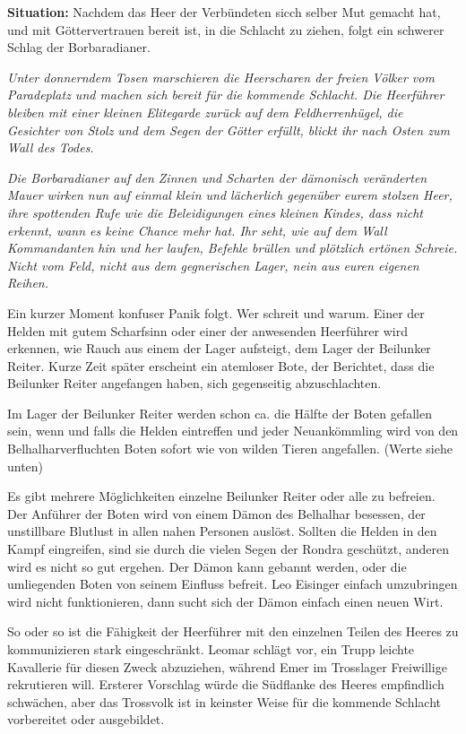 \textbf{Situation:} Nachdem das Heer der Verbündeten sicch selber Mut gemacht hat, und mit Göttervertrauen bereit ist, in die Schlacht zu ziehen, folgt ein schwerer Schlag der Borbaradianer. 

\emph{Unter donnerndem Tosen marschieren die Heerscharen der freien Völker vom Paradeplatz und machen sich bereit für die kommende Schlacht. Die Heerführer bleiben mit einer kleinen Elitegarde zurück auf dem Feldherrenhügel, die Gesichter von Stolz und dem Segen der Götter erfüllt, blickt ihr nach Osten zum Wall des Todes.}

\emph{Die Borbaradianer auf den Zinnen und Scharten der dämonisch veränderten Mauer wirken nun auf einmal klein und lächerlich gegenüber eurem stolzen Heer, ihre spottenden Rufe wie die Beleidigungen eines kleinen Kindes, dass nicht erkennt, wann es keine Chance mehr hat. Ihr seht, wie auf dem Wall Kommandanten hin und her laufen, Befehle brüllen und plötzlich ertönen Schreie. Nicht vom Feld, nicht aus dem gegnerischen Lager, nein aus euren eigenen Reihen.}

Ein kurzer Moment konfuser Panik folgt. Wer schreit und warum. Einer der Helden mit gutem Scharfsinn oder einer der anwesenden Heerführer wird erkennen, wie Rauch aus einem der Lager aufsteigt, dem Lager der Beilunker Reiter. Kurze Zeit später erscheint ein atemloser Bote, der Berichtet, dass die Beilunker Reiter angefangen haben, sich gegenseitig abzuschlachten. 

Im Lager der Beilunker Reiter werden schon ca. die Hälfte der Boten gefallen sein, wenn und falls die Helden eintreffen und jeder Neuankömmling wird von den Belhalharverfluchten Boten sofort wie von wilden Tieren angefallen. (Werte siehe unten)

Es gibt mehrere Möglichkeiten einzelne Beilunker Reiter oder alle zu befreien. Der Anführer der Boten wird von einem Dämon des Belhalhar besessen, der unstillbare Blutlust in allen nahen Personen auslöst. Sollten die Helden in den Kampf eingreifen, sind sie durch die vielen Segen der Rondra geschützt, anderen wird es nicht so gut ergehen. Der Dämon kann gebannt werden, oder die umliegenden Boten von seinem Einfluss befreit. Leo Eisinger einfach umzubringen wird nicht funktionieren, dann sucht sich der Dämon einfach einen neuen Wirt.

So oder so ist die Fähigkeit der Heerführer mit den einzelnen Teilen des Heeres zu kommunizieren stark eingeschränkt. Leomar schlägt vor, ein Trupp leichte Kavallerie für diesen Zweck abzuziehen, während Emer im Trosslager Freiwillige rekrutieren will. Ersterer Vorschlag würde die Südflanke des Heeres empfindlich schwächen, aber das Trossvolk ist in keinster Weise für die kommende Schlacht vorbereitet oder ausgebildet.


